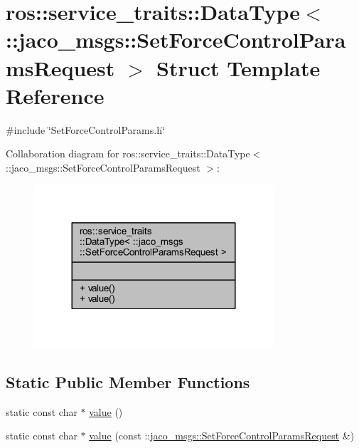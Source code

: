 \hypertarget{structros_1_1service__traits_1_1DataType_3_01_1_1jaco__msgs_1_1SetForceControlParamsRequest_01_4}{}\section{ros\+:\+:service\+\_\+traits\+:\+:Data\+Type$<$ \+:\+:jaco\+\_\+msgs\+:\+:Set\+Force\+Control\+Params\+Request $>$ Struct Template Reference}
\label{structros_1_1service__traits_1_1DataType_3_01_1_1jaco__msgs_1_1SetForceControlParamsRequest_01_4}


{\ttfamily \#include \char`\"{}Set\+Force\+Control\+Params.\+h\char`\"{}}



Collaboration diagram for ros\+:\+:service\+\_\+traits\+:\+:Data\+Type$<$ \+:\+:jaco\+\_\+msgs\+:\+:Set\+Force\+Control\+Params\+Request $>$\+:
\nopagebreak
\begin{figure}[H]
\begin{center}
\leavevmode
\includegraphics[width=252pt]{d4/deb/structros_1_1service__traits_1_1DataType_3_01_1_1jaco__msgs_1_1SetForceControlParamsRequest_01_4__coll__graph}
\end{center}
\end{figure}
\subsection*{Static Public Member Functions}
\begin{DoxyCompactItemize}
\item 
static const char $\ast$ \hyperlink{structros_1_1service__traits_1_1DataType_3_01_1_1jaco__msgs_1_1SetForceControlParamsRequest_01_4_a24aadfa2c085ff823106d8a04672efbb}{value} ()
\item 
static const char $\ast$ \hyperlink{structros_1_1service__traits_1_1DataType_3_01_1_1jaco__msgs_1_1SetForceControlParamsRequest_01_4_a0bfa2af348b8d7ce3a588407c9454d9e}{value} (const \+::\hyperlink{namespacejaco__msgs_a3486b7826c8a999135bb2eded905e7a8}{jaco\+\_\+msgs\+::\+Set\+Force\+Control\+Params\+Request} \&)
\end{DoxyCompactItemize}


